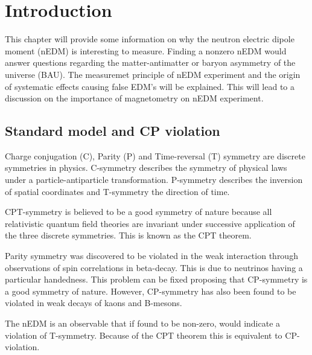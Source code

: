 \chapter{Introduction\label{ch:intro}}

This chapter will provide some information on why the neutron electric
dipole moment (nEDM) is interesting to measure.  Finding a nonzero
nEDM would answer questions regarding the matter-antimatter or baryon
asymmetry of the universe (BAU).  The measuremet principle of nEDM
experiment and the origin of systematic effects causing false EDM's
will be explained.  This will lead to a discussion on the importance
of magnetometry on nEDM experiment.

\section{Standard model and CP violation}

Charge conjugation (C), Parity (P) and Time-reversal (T) symmetry are
discrete symmetries in physics.  C-symmetry describes the symmetry of
physical laws under a particle-antiparticle transformation.
P-symmetry describes the inversion of spatial coordinates and
T-symmetry the direction of time.

CPT-symmetry is believed to be a good symmetry of nature because all
relativistic quantum field theories are invariant under successive
application of the three discrete symmetries.  This is known as the
CPT theorem.

Parity symmetry was discovered to be violated in the weak interaction
through observations of spin correlations in beta-decay.  This is due
to neutrinos having a particular handedness.  This problem can be
fixed proposing that CP-symmetry is a good symmetry of nature.
However, CP-symmetry has also been found to be violated in weak decays
of kaons and B-mesons.

The nEDM is an observable that if found to be non-zero, would indicate
a violation of T-symmetry.  Because of the CPT theorem this is
equivalent to CP-violation.

